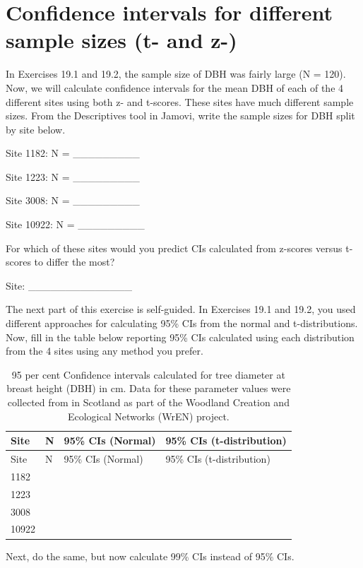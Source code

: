 \documentclass[
]{scrbook}
\begin{document}
\hypertarget{confidence-intervals-for-different-sample-sizes-t--and-z-}{%
\section{Confidence intervals for different sample sizes (t- and z-)}\label{confidence-intervals-for-different-sample-sizes-t--and-z-}}

In Exercises 19.1 and 19.2, the sample size of DBH was fairly large (N = 120).
Now, we will calculate confidence intervals for the mean DBH of each of the 4 different sites using both z- and t-scores.
These sites have much different sample sizes.
From the Descriptives tool in Jamovi, write the sample sizes for DBH split by site below.

Site 1182: N = \_\_\_\_\_\_\_\_\_

Site 1223: N = \_\_\_\_\_\_\_\_\_

Site 3008: N = \_\_\_\_\_\_\_\_\_

Site 10922: N = \_\_\_\_\_\_\_\_\_

For which of these sites would you predict CIs calculated from z-scores versus t-scores to differ the most?

Site: \_\_\_\_\_\_\_\_\_\_\_\_\_\_

The next part of this exercise is self-guided.
In Exercises 19.1 and 19.2, you used different approaches for calculating 95\% CIs from the normal and t-distributions.
Now, fill in the table below reporting 95\% CIs calculated using each distribution from the 4 sites using any method you prefer.

\begin{longtable}[]{@{}llll@{}}
\caption{95 per cent Confidence intervals calculated for tree diameter at breast height (DBH) in cm. Data for these parameter values were collected from in Scotland as part of the Woodland Creation and Ecological Networks (WrEN) project.}\tabularnewline
\toprule
Site & N & 95\% CIs (Normal) & 95\% CIs (t-distribution) \\
\midrule
\endfirsthead
\toprule
Site & N & 95\% CIs (Normal) & 95\% CIs (t-distribution) \\
\midrule
\endhead
1182 & & & \\
1223 & & & \\
3008 & & & \\
10922 & & & \\
\bottomrule
\end{longtable}

Next, do the same, but now calculate 99\% CIs instead of 95\% CIs.
\end{document}
